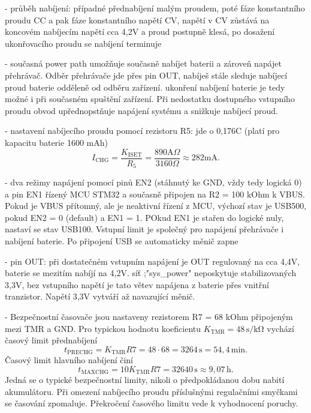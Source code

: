 - průběh nabíjení: případné přednabíjení malým proudem, poté fáze konstantního proudu CC a pak fáze konstantního napětí CV, napětí v CV zůstává na koncovém nabíjecím napětí cca 4,2V a proud postupně klesá, po dosažení ukonřovacího proudu se nabíjení terminuje

- současná power path umožňuje současně nabíjet baterii a zároveň napájet přehrávač. Odběr přehrávače jde přes pin OUT, nabíješ stále sleduje nabíjecí proud baterie odděleně od odběru zařízení. ukonření nabíjení baterie je tedy možné i při současném spuštění zařízení. Při nedostatku dostupného vstupního proudu obvod upřednopstňuje napájení systému a snižkuje nabíjecí proud.

- nastavení nabíjecího proudu pomocí rezistoru R5: jde o 0,176C (platí pro kapacitu baterie 1600 mAh)
\begin{equation}
    I_{\text{CHG}} = \frac{K_{\text{ISET}}}{R_5} = \frac{890 \text{A}\Omega}{3160 \Omega} \approx 282 \text{mA}.
    \label{eq:ichg}
\end{equation}

- dva režimy napájení pomocí pinů EN2 (stáhnutý ke GND, vždy tedy logická 0) a pin EN1 řízený MCU STM32 a současně připojen na R2 = 100 kOhm k VBUS. Pokud je VBUS přítomný, ale je neaktivní řízení z MCU, výchozí stav je USB500, pokud EN2 = 0 (default) a EN1 = 1. POkud EN1 je stařen do logické nuly, nastaví se stav USB100. Vstupní limit je společný pro napájení přehrávače i nabíjení baterie. Po připojení USB se automaticky měnič zapne

- pin OUT: při dostatečném vstupním napájení je OUT regulovaný na cca 4,4V, baterie se mezitím nabíjí na 4,2V. síť ;"sys\_power" neposkytuje stabilizovaných 3,3V, bez vstupního napětí je tato větev napájena z baterie přes vnitřní tranzistor. Napětí 3,3V vytváří až navazující měnič.

- Bezpečnostní časovače jsou nastaveny rezistorem R7 = 68 kOhm připojeným mezi TMR a GND. Pro typickou hodnotu koeficientu \(K_{\mathrm{TMR}}=48\,\mathrm{s/k\Omega}\) vychází časový limit přednabíjení
\[
t_{\mathrm{PRECHG}}
=K_{\mathrm{TMR}}R7
=48\cdot68
=3264\,\mathrm{s}
=54{,}4\,\mathrm{min}.
\]
Časový limit hlavního nabíjení činí
\[
t_{\mathrm{MAXCHG}}
=10K_{\mathrm{TMR}}R7
=32640\,\mathrm{s}
\approx9{,}07\,\mathrm{h}.
\]
Jedná se o typické bezpečnostní limity, nikoli o předpokládanou dobu nabití akumulátoru. Při omezení nabíjecího proudu příslušnými regulačními smyčkami se časování zpomaluje. Překročení časového limitu vede k vyhodnocení poruchy.


